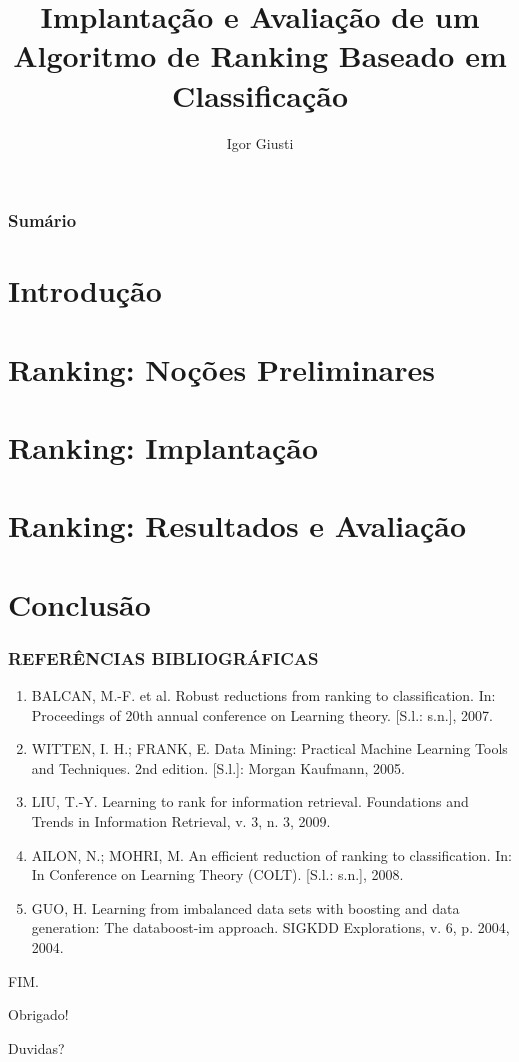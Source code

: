 \documentclass{beamer}
\title{Implantação e Avaliação de um Algoritmo de Ranking Baseado em Classificação}
\author{Igor Giusti}
\begin{document}
\frame{\titlepage}

\begin{frame}
    \frametitle{Sumário}
    \tableofcontents
\end{frame}

\section{Introdução}


\section{Ranking: Noções Preliminares}


\section{Ranking: Implantação}


\section{Ranking: Resultados e Avaliação}


\section{Conclusão}


\begin{frame}
    \frametitle{REFERÊNCIAS BIBLIOGRÁFICAS}

    \begin{enumerate}
        \item BALCAN, M.-F. et al. Robust reductions from ranking to classification. In: Proceedings of 20th annual conference on Learning theory. [S.l.: s.n.], 2007.
        \item WITTEN, I. H.; FRANK, E. Data Mining: Practical Machine Learning Tools and Techniques. 2nd edition. [S.l.]: Morgan Kaufmann, 2005.
        \item LIU, T.-Y. Learning to rank for information retrieval. Foundations and Trends in Information Retrieval, v. 3, n. 3, 2009.
        \item AILON, N.; MOHRI, M. An efficient reduction of ranking to classification. In: In Conference on Learning Theory (COLT). [S.l.: s.n.], 2008.
        \item GUO, H. Learning from imbalanced data sets with boosting and data generation: The databoost-im approach. SIGKDD Explorations, v. 6, p. 2004, 2004.
    \end{enumerate}
\end{frame}

\begin{frame}
    \centering
    FIM.

    Obrigado!
    
    Duvidas?

\end{frame}
\end{document}
